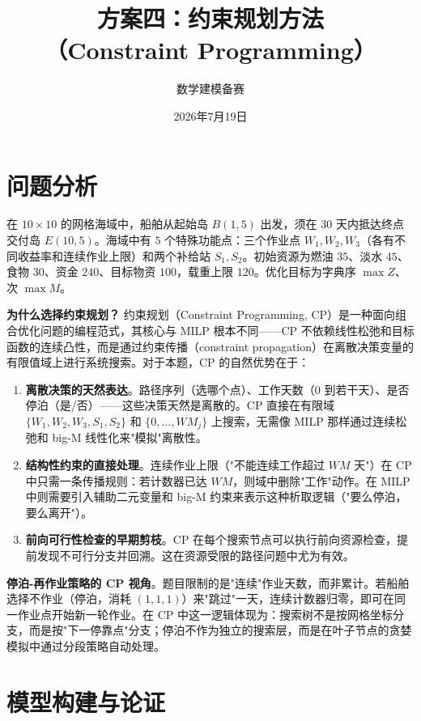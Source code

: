 \documentclass[12pt,a4paper]{ctexart}
\title{\textbf{方案四：约束规划方法\\（Constraint Programming）}}
\author{数学建模备赛}
\date{2026年7月19日}
\theoremstyle{definition}
\begin{document}
\maketitle

\section{问题分析}

在 $10\times 10$ 的网格海域中，船舶从起始岛 $B(1,5)$ 出发，须在 $30$ 天内抵达终点交付岛 $E(10,5)$。海域中有 $5$ 个特殊功能点：三个作业点 $W_1,W_2,W_3$（各有不同收益率和连续作业上限）和两个补给站 $S_1,S_2$。初始资源为燃油 $35$、淡水 $45$、食物 $30$、资金 $240$、目标物资 $100$，载重上限 $120$。优化目标为字典序 $\max Z$、次 $\max M$。

\textbf{为什么选择约束规划？} 约束规划（Constraint Programming, CP）是一种面向组合优化问题的编程范式，其核心与 MILP 根本不同——CP 不依赖线性松弛和目标函数的连续凸性，而是通过约束传播（constraint propagation）在离散决策变量的有限值域上进行系统搜索。对于本题，CP 的自然优势在于：

\begin{enumerate}
  \item \textbf{离散决策的天然表达}。路径序列（选哪个点）、工作天数（0 到若干天）、是否停泊（是/否）——这些决策天然是离散的。CP 直接在有限域 $\{W_1,W_2,W_3,S_1,S_2\}$ 和 $\{0,\dots,WM_j\}$ 上搜索，无需像 MILP 那样通过连续松弛和 big-M 线性化来"模拟"离散性。

  \item \textbf{结构性约束的直接处理}。连续作业上限（"不能连续工作超过 $WM$ 天"）在 CP 中只需一条传播规则：若计数器已达 $WM$，则域中删除"工作"动作。在 MILP 中则需要引入辅助二元变量和 big-M 约束来表示这种析取逻辑（"要么停泊，要么离开"）。

  \item \textbf{前向可行性检查的早期剪枝}。CP 在每个搜索节点可以执行前向资源检查，提前发现不可行分支并回溯。这在资源受限的路径问题中尤为有效。
\end{enumerate}

\textbf{停泊-再作业策略的 CP 视角}。题目限制的是"连续"作业天数，而非累计。若船舶选择不作业（停泊，消耗 $(1,1,1)$）来"跳过"一天，连续计数器归零，即可在同一作业点开始新一轮作业。在 CP 中这一逻辑体现为：搜索树不是按网格坐标分支，而是按"下一停靠点"分支；停泊不作为独立的搜索层，而是在叶子节点的贪婪模拟中通过分段策略自动处理。

\section{模型构建与论证}
\end{document}
